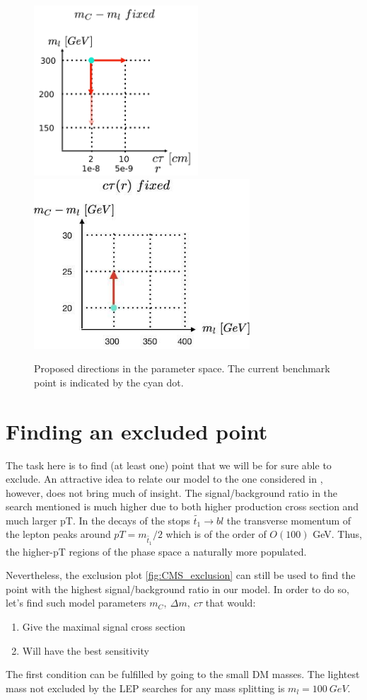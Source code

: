 \documentclass[12pt,letterpaper,notitlepage]{article}
\begin{document}
\begin{figure}[H]
\centering
\includegraphics[height=2.5in]{fig-benchmarks/ctau-m.png}
\includegraphics[height=2.5in]{fig-benchmarks/m-splitting.jpg}
\caption{\label{fig:first-benchmarks} Proposed directions in the parameter space. The current benchmark point is indicated by the cyan dot.}
\end{figure}
\newpage
\section{Finding an excluded point}
The task here is to find (at least one) point that we will be for sure able to exclude. An attractive idea to relate our model to the one considered in \cite{CMS:2016isf}, however, does not bring much of insight. The signal/background ratio in the search mentioned is much higher due to both higher production cross section and much larger pT. In the decays of the stops $\tilde{t_1}\rightarrow b l$ the transverse momentum of the lepton peaks around $pT=m_{\tilde{t_1}}/2$ which is of the order of $O(100)$ GeV. Thus, the higher-pT regions of the phase space a naturally more populated.

Nevertheless, the exclusion plot \ref{fig:CMS_exclusion} can still be used to find the point with the highest signal/background ratio in our model. In order to do so, let's find such model parameters $m_C,\ \Delta m,\ c\tau$ that would:
\begin{enumerate}
  \item Give the maximal signal cross section
  \item Will have the best sensitivity
\end{enumerate}
The first condition can be fulfilled by going to the small DM masses. The lightest mass not excluded by the LEP searches for any mass splitting is $m_l=100\ GeV$.
\end{document}
